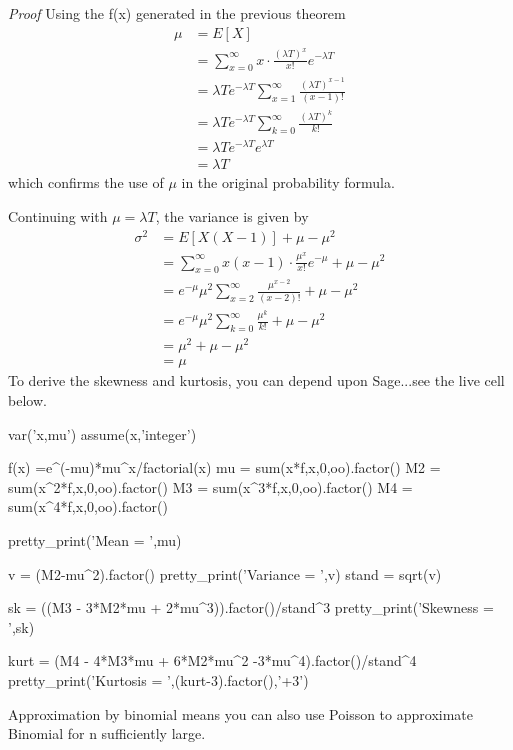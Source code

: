 \documentclass[10pt,]{book}
\makeatletter
\renewcommand*{\proofname}{Proof}
\renewenvironment{proof}[1][\proofname]{\par
  \pushQED{\qed}%
  \normalfont \topsep6\p@\@plus6\p@\relax
  \trivlist
  \item\relax
    {\itshape
    #1\@addpunct{.}}\hspace\labelsep\ignorespaces
}{%
  \popQED\endtrivlist\@endpefalse
}
\numberwithin{equation}{section}
\makeatother
\begin{document}
\begin{proof}\hypertarget{proof-54}{}
\hypertarget{p-957}{}%
Using the f(x) generated in the previous theorem%
\begin{align*}
\mu & = E[X] \\
& = \sum_{x=0}^{\infty} x \cdot \frac{(\lambda T)^x}{x!} e^{-\lambda T}\\
& = \lambda T e^{-\lambda T} \sum_{x=1}^{\infty} \frac{(\lambda T)^{x-1}}{(x-1)!} \\
& = \lambda T e^{-\lambda T} \sum_{k=0}^{\infty} \frac{(\lambda T)^k}{k!} \\
& = \lambda T e^{-\lambda T} e^{\lambda T} \\
& = \lambda T 
\end{align*}
which confirms the use of \(\mu\) in the original probability formula.%
\par
\hypertarget{p-958}{}%
Continuing with \(\mu = \lambda T\), the variance is given by%
\begin{align*}
\sigma^2 & = E[X(X-1)] + \mu - \mu^2 \\
& = \sum_{x=0}^{\infty} x(x-1) \cdot \frac{\mu^x}{x!} e^{-\mu} + \mu - \mu^2\\
& = e^{-\mu} \mu^2 \sum_{x=2}^{\infty} \frac{\mu^{x-2}}{(x-2)!} + \mu - \mu^2\\
& = e^{-\mu} \mu^2 \sum_{k=0}^{\infty} \frac{\mu^k}{k!} + \mu - \mu^2\\
& = \mu^2 + \mu - \mu^2 \\
& = \mu
\end{align*}
To derive the skewness and kurtosis, you can depend upon Sage...see the live cell below.%
\end{proof}
%
\par
\hypertarget{p-959}{}%
\leavevmode%
\begin{sageinput}
var('x,mu')
assume(x,'integer')

f(x) =e^(-mu)*mu^x/factorial(x)
mu = sum(x*f,x,0,oo).factor()
M2 = sum(x^2*f,x,0,oo).factor()
M3 = sum(x^3*f,x,0,oo).factor()
M4 = sum(x^4*f,x,0,oo).factor()

pretty_print('Mean = ',mu)

v = (M2-mu^2).factor()
pretty_print('Variance = ',v)
stand = sqrt(v)

sk = ((M3 - 3*M2*mu + 2*mu^3)).factor()/stand^3
pretty_print('Skewness = ',sk)

kurt = (M4 - 4*M3*mu + 6*M2*mu^2 -3*mu^4).factor()/stand^4
pretty_print('Kurtosis = ',(kurt-3).factor(),'+3')
\end{sageinput}
%
\par
\hypertarget{p-960}{}%
Approximation by binomial means you can also use Poisson to approximate Binomial for n sufficiently large.%
%
%
\typeout{************************************************}
\typeout{************************************************}
%
\end{document}

